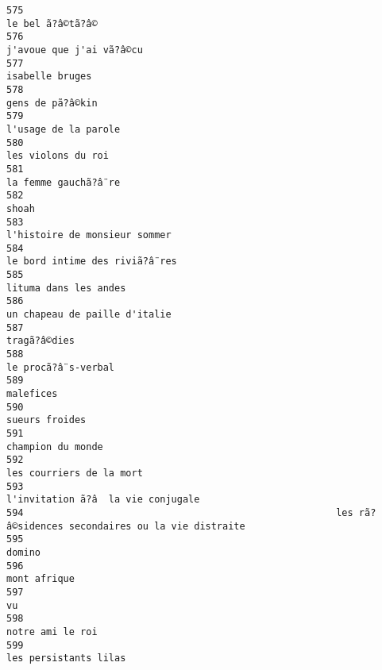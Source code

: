 \documentclass[
]{report}
\begin{document}
\begin{verbatim}
575                                                                                        le bel ã?â©tã?â©
576                                                                                j'avoue que j'ai vã?â©cu
577                                                                                         isabelle bruges
578                                                                                        gens de pã?â©kin
579                                                                                    l'usage de la parole
580                                                                                      les violons du roi
581                                                                                    la femme gauchã?â¨re
582                                                                                                   shoah
583                                                                           l'histoire de monsieur sommer
584                                                                          le bord intime des riviã?â¨res
585                                                                                   lituma dans les andes
586                                                                           un chapeau de paille d'italie
587                                                                                            tragã?â©dies
588                                                                                     le procã?â¨s-verbal
589                                                                                               malefices
590                                                                                          sueurs froides
591                                                                                       champion du monde
592                                                                                les courriers de la mort
593                                                                      l'invitation ã?â  la vie conjugale
594                                                       les rã?â©sidences secondaires ou la vie distraite
595                                                                                                  domino
596                                                                                            mont afrique
597                                                                                                      vu
598                                                                                        notre ami le roi
599                                                                                   les persistants lilas

\end{verbatim}
\end{document}
